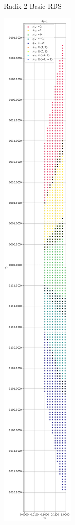\documentclass{article}
\begin{document}
\begin{figure}[htbp]
\begin{subfigure}[b]{0.32\textwidth}
    \caption{Radix-2 Basic RDS}
    \label{fig:sqrt:radix2_basic}
  \end{subfigure}
  \hfill
  \begin{subfigure}[b]{0.32\textwidth}
    \centering
    \includegraphics[width=\textwidth, height=3.5\textwidth, keepaspectratio=true]{../figures/square_root/radix4_rds_basic_quadrants_1_4.pdf}

\end{subfigure}
\end{figure}
\end{document}
